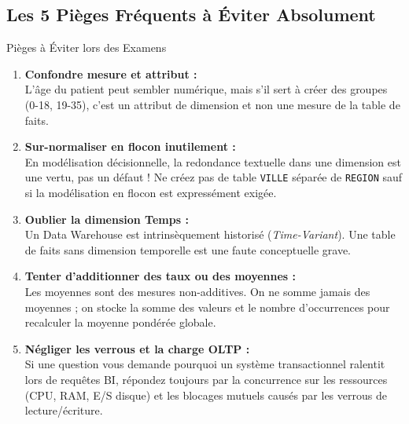 \documentclass[11pt, a4paper]{article}
\begin{document}
\subsection{Les 5 Pièges Fréquents à Éviter Absolument}
\begin{alertbox}{Pièges à Éviter lors des Examens}
\begin{enumerate}
    \item \textbf{Confondre mesure et attribut :}\\
    L'âge du patient peut sembler numérique, mais s'il sert à créer des groupes (0-18, 19-35), c'est un attribut de dimension et non une mesure de la table de faits.
    \item \textbf{Sur-normaliser en flocon inutilement :}\\
    En modélisation décisionnelle, la redondance textuelle dans une dimension est une vertu, pas un défaut ! Ne créez pas de table \texttt{VILLE} séparée de \texttt{REGION} sauf si la modélisation en flocon est expressément exigée.
    \item \textbf{Oublier la dimension Temps :}\\
    Un Data Warehouse est intrinsèquement historisé (\textit{Time-Variant}). Une table de faits sans dimension temporelle est une faute conceptuelle grave.
    \item \textbf{Tenter d'additionner des taux ou des moyennes :}\\
    Les moyennes sont des mesures non-additives. On ne somme jamais des moyennes ; on stocke la somme des valeurs et le nombre d'occurrences pour recalculer la moyenne pondérée globale.
    \item \textbf{Négliger les verrous et la charge OLTP :}\\
    Si une question vous demande pourquoi un système transactionnel ralentit lors de requêtes BI, répondez toujours par la concurrence sur les ressources (CPU, RAM, E/S disque) et les blocages mutuels causés par les verrous de lecture/écriture.
\end{enumerate}
\end{alertbox}
\end{document}
